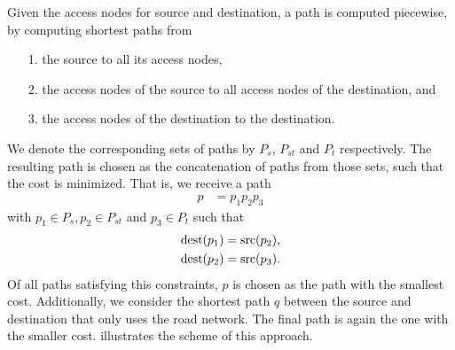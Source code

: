 	Given the access nodes for source and destination, a path is computed piecewise, by computing shortest paths from
	\begin{itemize}
		\item[1.] the source to all its access nodes,
		\item[2.] the access nodes of the source to all access nodes of the destination, and
		\item[3.] the access nodes of the destination to the destination.
	\end{itemize}
	We denote the corresponding sets of paths by $P_s$, $P_{st}$ and $P_t$ respectively. The resulting path is chosen
	as the concatenation of paths from those sets, such that the cost is minimized. That is, we receive a path
	\begin{align*}
		p	&= p_1p_2p_3
	\end{align*}
	with $p_1 \in P_s, p_2 \in P_{st}$ and $p_3 \in P_t$ such that
	\begin{align*}
		\operatorname{dest}(p_1)	&= \operatorname{src}(p_2),\\
		\operatorname{dest}(p_2)	&= \operatorname{src}(p_3).
	\end{align*}
	Of all paths satisfying this constraints, $p$ is chosen as the path with the smallest cost. Additionally, we consider the shortest path $q$
	between the source and destination that only uses the road network. The final path is again the one with the smaller cost.
	 illustrates the scheme of this approach.
